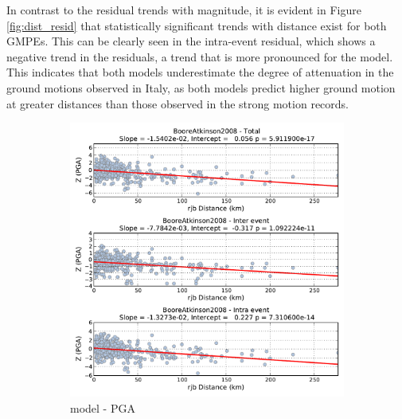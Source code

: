 In contrast to the residual trends with magnitude, it is evident in Figure \ref{fig:dist_resid} that statistically significant trends with distance exist for both GMPEs. This can be clearly seen in the intra-event residual, which shows a negative trend in the residuals, a trend that is more pronounced for the \cite{boore2008} model. This indicates that both models underestimate the degree of attenuation in the ground motions observed in Italy, as both models predict higher ground motion at greater distances than those observed in the strong motion records. 

\begin{figure}[htb]
  \centering
  \begin{subfigure}[b]{0.49\textwidth}
      \includegraphics[width=\textwidth]{./figures/residuals/BA2008_Distance_PGA.pdf}
      \caption{\cite{boore2008} model - PGA}
      \label{fig:pga_dist_ba2008}
  \end{subfigure}
    \begin{subfigure}[b]{0.49\textwidth}

\end{subfigure}
\end{figure}
